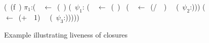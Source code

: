 \begin{wrapfigure}{l}{0.25\textwidth}
{\small
  \renewcommand{\arraystretch}{.8}{
    \begin{uprogram}
      \UFL (\DEFINE~(f~\px)
       $\pi_1$:(\LET~\py~$\leftarrow $\
      (\length~\px) \IN
       (\SIF~$\psi_1$:\py
      (\LET~\pu~$\leftarrow$~(\Sum~\px)~\IN
       (\LET~\pw~$\leftarrow$\ (/~\pu~\py)~\IN\  (\SRETURN~$\psi_2$:\pw)))
      \UNL{5}(\LET~\pz~$\leftarrow$~(+~\py~1)~\IN\ \UNL{6} (\SRETURN~$\psi_3$:\pz)))))   
  \end{uprogram}}
}
\caption{Example illustrating liveness of closures}\label{fig:lv-closure}
\vspace*{.1cm}
\end{wrapfigure}
